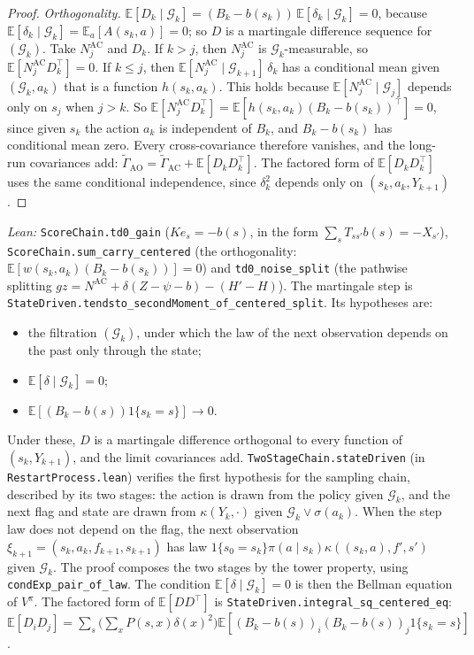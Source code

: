 \documentclass[11pt]{article}
\theoremstyle{definition}
\theoremstyle{remark}
\newcommand{\E}{\mathbb{E}}
\begin{document}
\begin{proof}
\emph{Orthogonality.} $\E[D_k\mid\mathcal G_k] = (B_k - b(s_k))\,\E[\delta_k\mid\mathcal G_k] = 0$, because
$\E[\delta_k\mid\mathcal G_k] = \E_a[A(s_k, a)] = 0$; so $D$ is a martingale difference sequence for
$(\mathcal G_k)$. Take $N^{\text{AC}}_j$ and $D_k$. If $k > j$, then $N^{\text{AC}}_j$ is $\mathcal G_k$-measurable, so
$\E[N^{\text{AC}}_jD_k^\top] = 0$. If $k \le j$, then $\E[N^{\text{AC}}_j\mid\mathcal G_{k+1}]\,\delta_k$ has a
conditional mean given $(\mathcal G_k, a_k)$ that is a function $h(s_k, a_k)$. This holds because
$\E[N^{\text{AC}}_j\mid\mathcal G_j]$ depends only on $s_j$ when $j > k$. So
$\E[N^{\text{AC}}_jD_k^\top] = \E[h(s_k, a_k)(B_k - b(s_k))^\top] = 0$, since given $s_k$ the action $a_k$ is
independent of $B_k$, and $B_k - b(s_k)$ has conditional mean zero. Every cross-covariance therefore
vanishes, and the long-run covariances add:
$\tilde\Gamma_{\text{AO}} = \tilde\Gamma_{\text{AC}} + \E[D_kD_k^\top]$. The factored form of $\E[D_kD_k^\top]$
uses the same conditional independence, since $\delta_k^2$ depends only on $(s_k, a_k, Y_{k+1})$.
\end{proof}
\noindent\emph{Lean:} \texttt{ScoreChain.td0\_gain} ($Ke_s = -b(s)$, in the form $\sum_sT_{ss'}b(s) = -X_{s'}$),
\texttt{ScoreChain.sum\_carry\_centered} (the orthogonality: $\E[w(s_k,a_k)(B_k - b(s_k))] = 0$) and
\texttt{td0\_noise\_split} (the pathwise splitting
$g z = N^{\text{AC}} + \delta(Z - \psi - b) - (H' - H)$). The martingale step is
\texttt{StateDriven.tendsto\_secondMoment\_of\_centered\_split}. Its hypotheses are:
\begin{itemize}
\item the filtration $(\mathcal G_k)$, under which the law of the next observation depends on the past
  only through the state;
\item $\E[\delta\mid\mathcal G_k] = 0$;
\item $\E[(B_k - b(s))1\{s_k = s\}] \to 0$.
\end{itemize}
Under these, $D$ is a martingale difference orthogonal to every function of $(s_k, Y_{k+1})$, and the
limit covariances add. \texttt{TwoStageChain.stateDriven} (in \texttt{RestartProcess.lean}) verifies
the first hypothesis for the sampling chain, described by its two stages: the action is drawn from
the policy given $\mathcal G_k$, and the next flag and state are drawn from $\kappa(Y_k,\cdot)$ given
$\mathcal G_k \vee \sigma(a_k)$. When the step law does not depend on the flag, the next observation
$\xi_{k+1} = (s_k, a_k, f_{k+1}, s_{k+1})$ has law $1\{s_0 = s_k\}\pi(a\mid s_k)\kappa((s_k, a), f', s')$ given
$\mathcal G_k$. The proof composes the two stages by the tower property, using
\texttt{condExp\_pair\_of\_law}. The condition $\E[\delta\mid\mathcal G_k] = 0$ is then the Bellman equation
of $V^\pi$. The factored form of $\E[DD^\top]$ is \texttt{StateDriven.integral\_sq\_centered\_eq}:
$\E[D_iD_j] = \sum_s\big(\sum_xP(s,x)\delta(x)^2\big)\E[(B_k - b(s))_i(B_k - b(s))_j1\{s_k = s\}]$.
\end{document}
